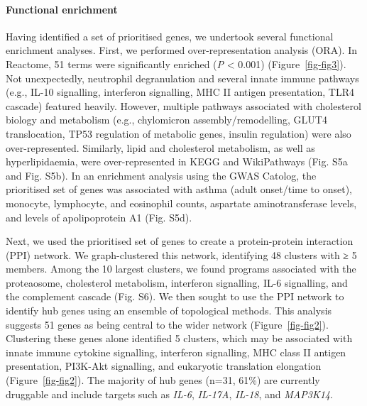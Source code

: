 \documentclass[
  11,
  a4paper,
]{article}
\let\oldparagraph\paragraph
\renewcommand{\paragraph}[1]{\oldparagraph{#1}\mbox{}}
\begin{document}
\hypertarget{functional-enrichment}{%
\paragraph{Functional enrichment}\label{functional-enrichment}}

Having identified a set of prioritised genes, we undertook several
functional enrichment analyses. First, we performed over-representation
analysis (ORA). In Reactome, 51 terms were significantly enriched
(\emph{P} \textless{} 0.001) (Figure~\ref{fig-fig3}). Not unexpectedly,
neutrophil degranulation and several innate immune pathways (e.g., IL-10
signalling, interferon signalling, MHC II antigen presentation, TLR4
cascade) featured heavily. However, multiple pathways associated with
cholesterol biology and metabolism (e.g., chylomicron
assembly/remodelling, GLUT4 translocation, TP53 regulation of metabolic
genes, insulin regulation) were also over-represented. Similarly, lipid
and cholesterol metabolism, as well as hyperlipidaemia, were
over-represented in KEGG and WikiPathways (Fig. S5a and Fig. S5b). In an
enrichment analysis using the GWAS Catolog, the prioritised set of genes
was associated with asthma (adult onset/time to onset), monocyte,
lymphocyte, and eosinophil counts, aspartate aminotransferase levels,
and levels of apolipoprotein A1 (Fig. S5d).

Next, we used the prioritised set of genes to create a protein-protein
interaction (PPI) network. We graph-clustered this network, identifying
48 clusters with ≥ 5 members. Among the 10 largest clusters, we found
programs associated with the proteaosome, cholesterol metabolism,
interferon signalling, IL-6 signalling, and the complement cascade (Fig.
S6). We then sought to use the PPI network to identify hub genes using
an ensemble of topological methods. This analysis suggests 51 genes as
being central to the wider network (Figure~\ref{fig-fig2}). Clustering
these genes alone identified 5 clusters, which may be associated with
innate immune cytokine signalling, interferon signalling, MHC class II
antigen presentation, PI3K-Akt signalling, and eukaryotic translation
elongation (Figure~\ref{fig-fig2}). The majority of hub genes (n=31,
61\%) are currently druggable and include targets such as \emph{IL-6},
\emph{IL-17A}, \emph{IL-18}, and \emph{MAP3K14}.
\end{document}
